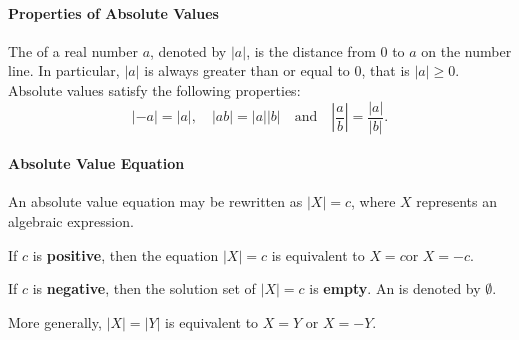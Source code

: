
\paragraph*{Properties of Absolute Values}


	The  of a real number $a$, denoted by $|a|$, is the distance from $0$ to $a$ on the number line. In particular, $|a|$ is always greater than or equal to $0$, that is $|a|\geq 0$. Absolute values satisfy the following properties:
	$$
	|-a|=|a|, \quad |ab|=|a||b| \quad \text{and} \quad \left|\frac{a}{b}\right|=\frac{|a|}{|b|}.
	$$

\paragraph*{Absolute Value Equation} An absolute value equation may be rewritten as $|X|=c$, where $X$ represents an algebraic expression.

	If $c$ is \textbf{positive}, then the equation $|X|=c$ is equivalent to {$X=c$\quad or \quad $X=-c$.}

	If $c$ is \textbf{negative}, then the solution set of $|X|=c$ is \textbf{empty}.
	An  is denoted by $\emptyset$.

	More generally, $|X|=|Y|$ is equivalent to $X=Y$ or $X=-Y$.





